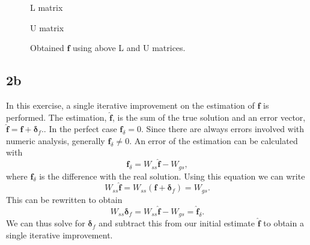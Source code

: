 \begin{figure}[!ht]
    \centering
    
    \caption{L matrix}
    \label{fig:2a_L}
\end{figure}

\begin{figure}[!ht]
    \centering
    
    \caption{U matrix}
    \label{fig:2a_U}
\end{figure}

\begin{figure}[!ht]
    \centering
    
    \caption{Obtained $\mathbf{f}$ using above L and U matrices.}
    \label{fig:2a_f}
\end{figure}

\newpage

\subsection*{2b}
In this exercise, a single iterative improvement on the estimation of $\mathbf{f}$ is performed. The estimation, $\hat{\mathbf{f}}$, is the sum of the true solution and an error vector, $\hat{\mathbf{f}} = \mathbf{f} + \mathbf{\delta}_f.$. In the perfect case $\mathbf{f}_\delta=0$. Since there are always errors involved with numeric analysis, generally $\mathbf{f}_\delta\neq 0$. An error of the estimation can be calculated with
\begin{equation}
    \mathbf{f}_\delta = W_{ss}\mathbf{\hat{f}} - W_{gs},
\end{equation}
where $\mathbf{f}_\delta$ is the difference with the real solution. Using this equation we can write
\begin{equation}
    W_{ss}\hat{\mathbf{f}} = W_{ss}(\mathbf{f} + \mathbf{\delta}_f) = W_{gs}.
\end{equation}
This can be rewritten to obtain
\begin{equation}
    W_{ss}\mathbf{\delta}_f = W_{ss}\mathbf{\hat{f}} - W_{gs} = \hat{\mathbf{f}}_\delta.
\end{equation}
We can thus solve for $\mathbf{\delta}_f$ and subtract this from our initial estimate $\hat{\mathbf{f}}$ to obtain a single iterative improvement.

